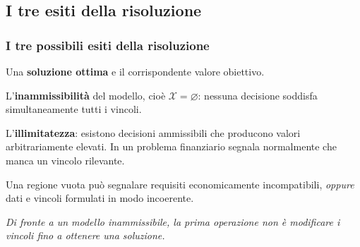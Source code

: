

\subsection{I tre esiti della risoluzione}%

\begin{frame}%
%

\frametitle{I tre possibili esiti della risoluzione}%
%

%


\begin{stepenumerate}
\item[1.] Una \textbf{soluzione ottima} e il corrispondente valore obiettivo.

\item[2.] L'\textbf{inammissibilit\`{a}} del modello, cio\`{e} $\mathcal{X}%
=\varnothing$: nessuna decisione soddisfa simultaneamente tutti i vincoli.

\item[3.] L'\textbf{illimitatezza}: esistono decisioni ammissibili che
producono valori arbitrariamente elevati. In un problema finanziario segnala
normalmente che manca un vincolo rilevante.
\end{stepenumerate}

\medskip

Una regione vuota pu\`{o} segnalare requisiti economicamente incompatibili,
\emph{oppure} dati e vincoli formulati in modo incoerente.

\medskip

\begin{center}
{\small \emph{Di fronte a un modello inammissibile, la prima operazione non
\`{e} modificare i vincoli fino a ottenere una soluzione.}}
\end{center}

%

\transboxout
\end{frame}%


